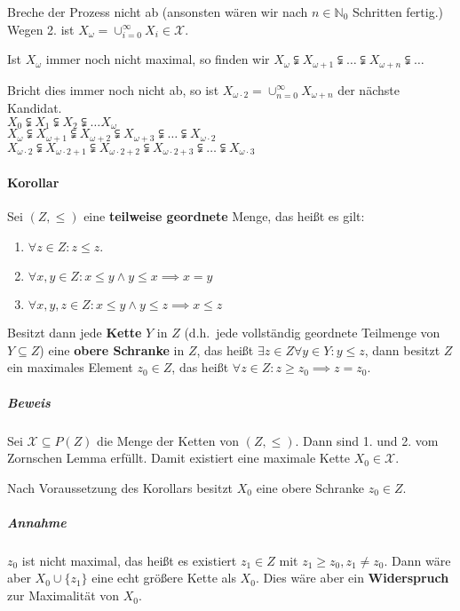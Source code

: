 \documentclass[14pt,a4paper]{article}
\newcommand{\N}{\ensuremath{\mathbb{N}}}
\newcommand{\Nzero}{\ensuremath{\N_0}}
\begin{document}
  Breche der Prozess nicht ab (ansonsten wären wir nach $n \in \Nzero$ Schritten
  fertig.)\\
  Wegen 2. ist $X_\omega = \cup_{i=0}^{\infty} X_i \in \mathscr{X}$.

  Ist $X_\omega$ immer noch nicht maximal, so finden wir $X_\omega \subsetneqq
  X_{\omega + 1} \subsetneqq \ldots \subsetneqq X_{\omega + n} \subsetneqq
  \ldots$

  Bricht dies immer noch nicht ab, so ist $X_{\omega \cdot 2} = \cup_{n=0}^{\infty} X_{\omega +
    n}$ der nächste Kandidat.\\%
  $X_0 \subsetneqq X_1 \subsetneqq X_2 \subsetneqq \ldots X_\omega$\\
  $X_\omega  \subsetneqq X_{\omega+1} \subsetneqq X_{\omega+2} \subsetneqq
  X_{\omega+3} \subsetneqq \ldots \subsetneqq X_{\omega \cdot 2}$\\
  $X_{\omega\cdot2}  \subsetneqq X_{\omega\cdot2+1} \subsetneqq X_{\omega\cdot2+2} \subsetneqq
  X_{\omega\cdot2+3} \subsetneqq \ldots \subsetneqq X_{\omega \cdot 3}$

  \paragraph{Korollar}
  Sei $(Z, \leq)$ eine \textbf{teilweise geordnete} Menge, das heißt es gilt:
  \begin{enumerate}
    \item $\forall z \in Z : z \leq z$.
    \item $\forall x,y \in Z : x \leq y \land y \leq x \implies x = y $
    \item $\forall x,y,z \in Z : x \leq y \land y \leq z \implies x \leq z$
  \end{enumerate}

  Besitzt dann jede \textbf{Kette} $Y$ in $Z$ (d.h.\ jede vollständig geordnete Teilmenge
  von $Y \subseteq Z$) eine \textbf{obere Schranke} in $Z$, das heißt $\exists z
  \in Z \forall y \in Y : y \leq z$, dann besitzt $Z$ ein maximales Element $z_0
  \in Z$, das heißt $\forall z \in Z : z \geq z_0 \implies z = z_0$.

  \subparagraph{Beweis}
  Sei $\mathscr{X} \subseteq P(Z)$ die Menge der Ketten von $(Z, \leq)$.
  Dann sind 1. und 2. vom Zornschen Lemma erfüllt.
  Damit existiert eine maximale Kette $X_0 \in \mathscr{X}$.

  Nach Voraussetzung des Korollars besitzt $X_0$ eine obere Schranke $z_0 \in
  Z$.

  \subparagraph{Annahme}
  $z_0$ ist nicht maximal, das heißt es existiert  $z_1 \in Z$ mit $z_1 \geq
  z_0, z_1 \neq z_0$.
  Dann wäre aber $X_0 \cup \{z_1\}$ eine echt größere Kette als $X_0$.
  Dies wäre aber ein \textbf{Widerspruch} zur Maximalität von $X_0$.
\end{document}

